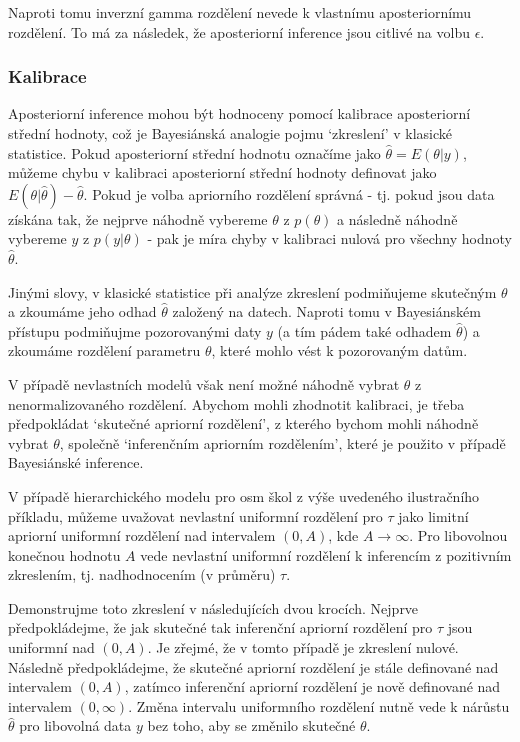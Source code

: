 Naproti tomu inverzní gamma rozdělení nevede k vlastnímu aposteriornímu rozdělení. To má za následek, že aposteriorní inference jsou citlivé na volbu $\epsilon$.

\subsubsection{Kalibrace}

Aposteriorní inference mohou být hodnoceny pomocí kalibrace aposteriorní střední hodnoty, což je Bayesiánská analogie pojmu `zkreslení' v klasické statistice. Pokud aposteriorní střední hodnotu označíme jako $\hat{\theta} = E(\theta | y)$, můžeme chybu v kalibraci aposteriorní střední hodnoty definovat jako $E(\theta | \hat{\theta}) - \hat{\theta}$. Pokud je volba apriorního rozdělení správná - tj. pokud jsou data získána tak, že nejprve náhodně vybereme $\theta$ z $p(\theta)$ a následně náhodně vybereme $y$ z $p(y | \theta)$ - pak je míra chyby v kalibraci nulová pro všechny hodnoty $\hat{\theta}$.

Jinými slovy, v klasické statistice při analýze zkreslení podmiňujeme skutečným $\theta$ a zkoumáme jeho odhad $\hat{\theta}$ založený na datech. Naproti tomu v Bayesiánském přístupu podmiňujme pozorovanými daty $y$ (a tím pádem také odhadem $\hat{\theta}$) a zkoumáme rozdělení parametru $\theta$, které mohlo vést k pozorovaným datům.

V případě nevlastních modelů však není možné náhodně vybrat $\theta$ z nenormalizovaného rozdělení. Abychom mohli zhodnotit kalibraci, je třeba předpokládat `skutečné apriorní rozdělení', z kterého bychom mohli náhodně vybrat $\theta$, společně `inferenčním apriorním rozdělením', které je použito v případě Bayesiánské inference.

V případě hierarchického modelu pro osm škol z výše uvedeného ilustračního příkladu, můžeme uvažovat nevlastní uniformní rozdělení pro $\tau$ jako limitní apriorní uniformní rozdělení nad intervalem $(0, A)$, kde $A \rightarrow \infty$. Pro libovolnou konečnou hodnotu $A$ vede nevlastní uniformní rozdělení k inferencím z pozitivním zkreslením, tj. nadhodnocením (v průměru) $\tau$.

Demonstrujme toto zkreslení v následujících dvou krocích. Nejprve předpokládejme, že jak skutečné tak inferenční apriorní rozdělení pro $\tau$ jsou uniformní nad $(0, A)$. Je zřejmé, že v tomto případě je zkreslení nulové. Následně předpokládejme, že skutečné apriorní rozdělení je stále definované nad intervalem $(0, A)$, zatímco inferenční apriorní rozdělení je nově definované nad intervalem $(0, \infty)$. Změna intervalu uniformního rozdělení nutně vede k nárůstu $\hat{\theta}$ pro libovolná data $y$ bez toho, aby se změnilo skutečné $\theta$.

